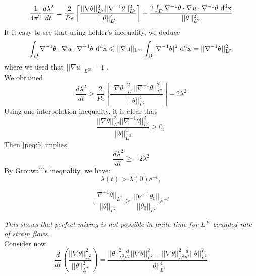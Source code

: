 \documentclass[12pt]{report}   %
\renewcommand{\leq}{\leqslant}
\renewcommand{\geq}{\geqslant}
\numberwithin{equation}{section}
\theoremstyle{plain}
\theoremstyle{definition}
\theoremstyle{remark}
\begin{document}
\[\frac{1}{4\pi^2}\frac{d\lambda^2}{dt} = \frac{2}{Pe}\left[ \frac{||\nabla\theta||_{L^2}^2||\nabla^{-1}\theta||_{L^2}^2}{||\theta||_{L^2}^4} \right] + \frac{2\int_D\nabla^{-1}\theta\cdot\nabla u\cdot \nabla^{-1}\theta ~\rm{d}^dx}{||\theta||_{L^2}^2} \]
It is easy to see that using holder's inequality, we deduce
\[\int_D \nabla^{-1}\theta\cdot\nabla u\cdot\nabla^{-1}\theta ~\rm{d}^dx \leq ||\nabla u||_{L^\infty}\int_D |\nabla^{-1}\theta|^2 ~\rm{d}^dx =  ||\nabla^{-1}\theta||_{L^2}^2\]
where we used that  $||\nabla u||_{L^\infty} = 1$ . \\
We obtained
\begin{equation}
\frac{d\lambda^2}{dt} \geq \frac{2}{Pe}\left[ \frac{||\nabla\theta||_{L^2}^2||\nabla^{-1}\theta||_{L^2}^2}{||\theta||_{L^2}^4}  \right] - 2\lambda^2 \label{peq:5}
\end{equation}
Using one interpolation inequality, it is clear that 
\[\frac{||\nabla\theta||_{L^2}^2 ||\nabla^{-1}\theta||_{L^2}^2}{||\theta||_{L^2}^4} \geq 0,\]
Then \eqref{peq:5} implies
\[ \frac{d\lambda^2}{dt} \geq  -2\lambda^2 \]
By Gronwall's inequality, we have:
\begin{equation}
\lambda(t) > \lambda(0)e^{-t} , \label{peq:8}
\end{equation}

\[\frac{||\nabla^{-1}\theta||_{L^2}}{||\theta||_{L^2}} \geq \frac{||\nabla^{-1}\theta_0||}{||\theta_{0}||_{L^2}} e^{-t}\]

\textit{This shows that perfect mixing is not possible in finite time for $L^\infty$ bounded rate of strain flows.}\\

Consider now
\[\frac{d}{dt}\left( \frac{||\nabla\theta||_{L^2}^2}{||\theta||_{L^2}^2} \right)
 = \frac{||\theta||_{L^2}^2\frac{d}{dt}||\nabla\theta||_{L^2}^2   - ||\nabla\theta||_{L^2}^2 \frac{d}{dt}||\theta||_{L^2}^2 }{||\theta||_{L^2}^4} \]
 
\end{document}
